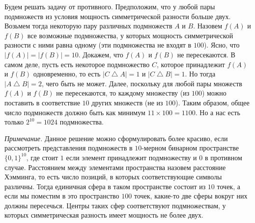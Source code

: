 \documentclass{article}
\begin{document}
Будем решать задачу от противного. Предположим, что у любой пары подмножеств из условия мощность симметрической разности больше двух. 
Возьмем тогда некоторую пару различных подмножеств $A$ и $B$. Назовем $f(A)$ и $f(B)$ все возможные подмножества, у 
которых мощность симметрической разности с ними равна одному (эти подмножества не входят в $100$). Ясно, что $|f(A)| = |f(B)| = 10$.
Докажем, что $f(A)$ и $f(B)$ не пересекаются. 
В самом деле, пусть есть некоторое подмножество $C$, которое принадлежит $f(A)$ и $f(B)$ одновременно, то есть
$|C \bigtriangleup A| = 1$ и $|C \bigtriangleup B| = 1$. Но тогда $|A \bigtriangleup B| = 2$, чего быть не может.
Далее, поскольку для любой пары множеств $f(A)$ и $f(B)$ не пересекаются, то каждому множеству (из $100$) можно поставить в соответствие 
$10$ других множеств (не из $100$). Таким образом, общее число подмножеств должно быть как минимум $11 \times 100 = 1100$. 
Но а нас есть только $2^{10} = 1024$ подмножества.

\textit{Примечание.} Данное решение можно сформулировать более красиво, если рассмотреть представления подмножеств в $10$-мерном бинарном 
пространстве $\{0, 1\}^{10}$, где стоит $1$ если элемент принадлежит подмножеству и $0$ в противном случае. Расстоянием между 
элементами пространства назовем расстояние Хэмминга, то есть число позиций, в которых соответствующие символы различны. 
Тогда единичная сфера в таком пространстве состоит из $10$ точек, а если мы поместим в это пространство $100$ точек, какие-то 
две сферы вокруг них должны пересечься. Центры таких сфер соответствуют подмножествам, у которых симметрическая разность имеет мощность не более 
двух.
\end{document}
